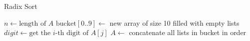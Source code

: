 \documentclass{article}
\begin{document}
\begin{algorithm}
\caption{Radix Sort}
\begin{algorithmic}[1]
 
    \State $n \gets \text{length of } A$
        \State $\text{bucket}[0..9] \gets$ new array of size 10 filled with empty lists
            \State $digit \gets \text{get the } i\text{-th digit of } A[j]$
            \State {}
        \EndFor
        \State $A \gets$ concatenate all lists in bucket in order
    \EndFor
\EndProcedure
\end{algorithmic}
\end{algorithm}
\end{document}
